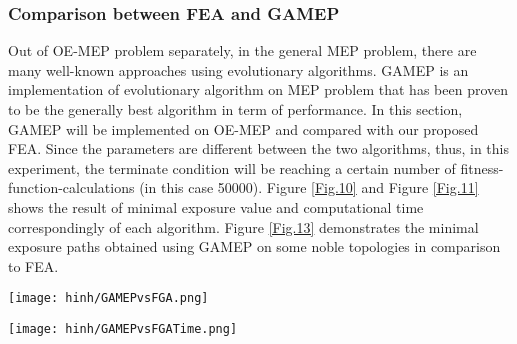 \documentclass[final]{elsarticle}
\begin{document}
\subsubsection{Comparison between FEA and GAMEP}
Out of OE-MEP problem separately, in the general MEP problem, there are many well-known approaches using evolutionary algorithms. GAMEP \cite{binh2019efficient} is an implementation of evolutionary algorithm on MEP problem that has been proven to be the generally best algorithm in term of performance. In this section, GAMEP will be implemented on OE-MEP and compared with our proposed FEA. Since the parameters are different between the two algorithms, thus, in this experiment, the terminate condition will be reaching a certain number of fitness-function-calculations (in this case 50000). Figure \ref{Fig.10} and Figure \ref{Fig.11} shows the result of minimal exposure value and computational time correspondingly of each algorithm. Figure \ref{Fig.13} demonstrates the minimal exposure paths obtained using GAMEP on some noble topologies in comparison to FEA.
\begin{figure*}[h]
	\texttt{[image: hinh/GAMEPvsFGA.png]}
	\centering
	\caption{The minimal exposure value comparison between FEA and GAMEP on some noble topologies
	}
	\label{Fig.10}       %
\end{figure*}
\begin{figure*}[h]
	\texttt{[image: hinh/GAMEPvsFGATime.png]}
	\centering
	\caption{The computational time (sec) comparison between FEA and GAMEP on some noble topologies
	}
	\label{Fig.11}       %
\end{figure*}
\end{document}
